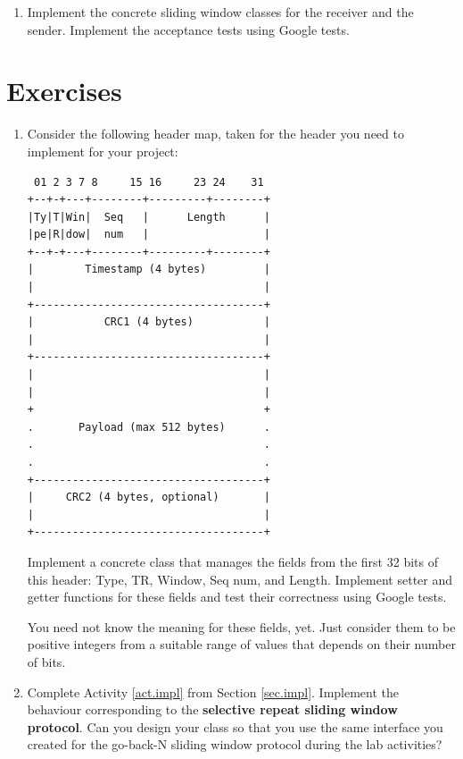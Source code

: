 \documentclass[12pt]{book}
\begin{document}
\begin{enumerate}[resume*]
\item\label{act.impl} Implement the concrete sliding window classes for the receiver and the sender. Implement the acceptance tests using Google tests. 
\end{enumerate}


\section{Exercises}

\begin{enumerate}[label=\arabic*.]
\item Consider the following header map, taken for the header you need to implement for your project:
\begin{verbatim}
 01 2 3 7 8     15 16     23 24    31
+--+-+---+--------+---------+--------+
|Ty|T|Win|  Seq   |      Length      |
|pe|R|dow|  num   |                  |
+--+-+---+--------+---------+--------+
|        Timestamp (4 bytes)         |
|                                    |
+------------------------------------+
|           CRC1 (4 bytes)           |
|                                    |
+------------------------------------+
|                                    |
|                                    |
+                                    +
.       Payload (max 512 bytes)      .
.                                    .
.                                    .
+------------------------------------+
|     CRC2 (4 bytes, optional)       |
|                                    |
+------------------------------------+
\end{verbatim}

Implement a concrete class that manages the fields from the first 32 bits of this header: Type, TR, Window, Seq num, and Length. Implement setter and getter functions for these fields and test their correctness using Google tests.

You need not know the meaning for these fields, yet. Just consider them to be positive integers from a suitable range of values that depends on their number of bits.

\item Complete Activity \ref{act.impl} from Section \ref{sec.impl}. Implement the behaviour corresponding to the \textbf{selective repeat sliding window protocol}. Can you design your class so that you use the same interface you created for the go-back-N sliding window protocol during the lab activities? 
\end{enumerate}
\end{document}
